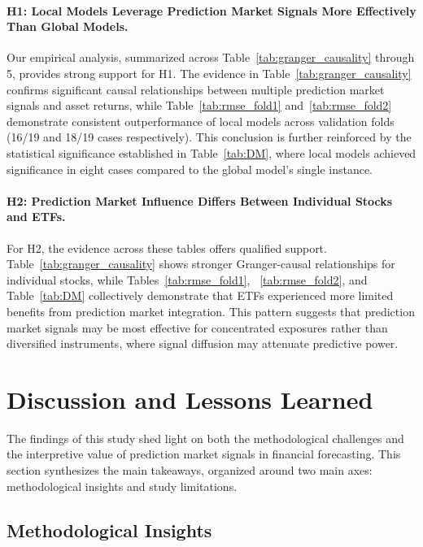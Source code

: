 \documentclass[12pt]{report}
\begin{document}
\paragraph{H1: Local Models Leverage Prediction Market Signals More Effectively Than Global Models.}
Our empirical analysis, summarized across Table~\ref{tab:granger_causality} through 5, provides strong support for H1. The evidence in Table~\ref{tab:granger_causality} confirms significant causal relationships between multiple prediction market signals and asset returns, while Table~\ref{tab:rmse_fold1} and~\ref{tab:rmse_fold2} demonstrate consistent outperformance of local models across validation folds (16/19 and 18/19 cases respectively). This conclusion is further reinforced by the statistical significance established in Table~\ref{tab:DM}, where local models achieved significance in eight cases compared to the global model's single instance.\\


\paragraph{H2: Prediction Market Influence Differs Between Individual Stocks and ETFs.}
For H2, the evidence across these tables offers qualified support. Table~\ref{tab:granger_causality} shows stronger Granger-causal relationships for individual stocks, while Tables~\ref{tab:rmse_fold1}, ~\ref{tab:rmse_fold2}, and Table~\ref{tab:DM} collectively demonstrate that ETFs experienced more limited benefits from prediction market integration. This pattern suggests that prediction market signals may be most effective for concentrated exposures rather than diversified instruments, where signal diffusion may attenuate predictive power.




\newpage
\section{Discussion and Lessons Learned}

The findings of this study shed light on both the methodological challenges and the interpretive value of prediction market signals in financial forecasting. This section synthesizes the main takeaways, organized around two main axes: methodological insights and study limitations.

\subsection{Methodological Insights}
\end{document}
